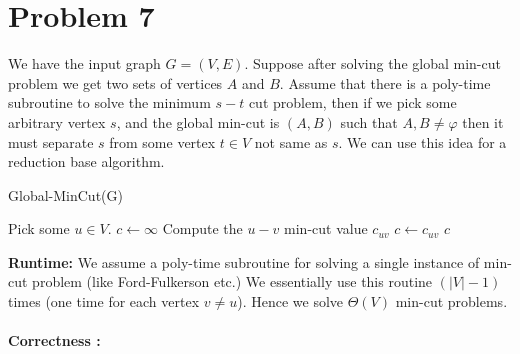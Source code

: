 \documentclass{article}
\newcommand{\bigTheta}[1]{\Theta(#1)}
\begin{document}
    \section{Problem 7}
    We have the input graph $G = (V, E)$. Suppose after solving the global min-cut problem we get two sets of vertices $A$ and $B$. Assume that there is a poly-time subroutine to solve the minimum $s-t$ cut problem, then if we pick some arbitrary vertex $s$, and the global min-cut is $(A, B)$ such that $A, B\not=\varphi$ then it must separate $s$ from some vertex $t \in V$ not same as $s$. We can use this idea for a reduction base algorithm. 
    \begin{algorithm}[H]
        \caption{Global-MinCut(G)}
        \begin{algorithmic}[1]
            \State Pick some $u \in V$. 
            \State $c \leftarrow \infty$
            \State Compute the $u-v$ min-cut value $c_{uv}$
                \State $c \leftarrow c_{uv}$
            \EndIf
            \EndFor
            \Return $c$
        \end{algorithmic}
    \end{algorithm}
    \noindent \textbf{Runtime:} We assume a poly-time subroutine for solving a single instance of min-cut problem (like Ford-Fulkerson etc.) We essentially use this routine $(|V|-1)$ times (one time for each vertex $v\not= u$). Hence we solve $\bigTheta{V}$ min-cut problems. \\\\
    \textbf{Correctness :}
\end{document}
